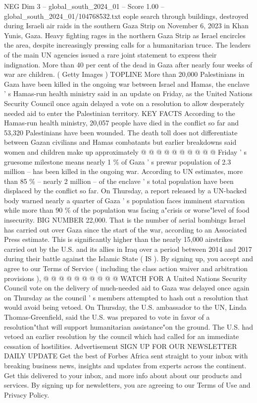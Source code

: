 \begin{textsample}{NEG Dim 3 – global\_south\_2024\_01 – Score 1.00 – global\_south\_2024\_01/104768532.txt}  \label{ex:f3_neg_104}
eople search through buildings, destroyed during Israeli air raids in the southern Gaza Strip on November 6, 2023 in Khan Yunis, Gaza.
Heavy fighting rages in the northern Gaza Strip as Israel encircles the area, despite increasingly pressing calls for a humanitarian truce.
The leaders of the main UN agencies issued a rare joint statement to express their indignation.
More than 40 per cent of the dead in Gaza after nearly four weeks of war are children. ( Getty Images ) TOPLINE More than 20,000 Palestinians in Gaza have been killed in the ongoing war between Israel and Hamas, the enclave ' s Hamas-run health ministry said in an update on Friday, as the United Nations Security Council once again delayed a vote on a resolution to allow desperately needed aid to enter the Palestinian territory.
KEY FACTS According to the Hamas-run health ministry, 20,057 people have died in the conflict so far and 53,320 Palestinians have been wounded.
The death toll does not differentiate between Gazan civilians and Hamas combatants but earlier breakdowns said women and children make up approximately @ @ @ @ @ @ @ @ @ @ Friday ' s gruesome milestone means nearly 1 \% of Gaza ' s prewar population of 2.3 million -- has been killed in the ongoing war.
According to UN estimates, more than 85 \% -- nearly 2 million -- of the enclave ' s total population have been displaced by the conflict so far.
On Thursday, a report released by a UN-backed body warned nearly a quarter of Gaza ' s population faces imminent starvation while more than 90 \% of the population was facing a"crisis or worse"level of food insecurity.
BIG NUMBER 22,000.
That is the number of aerial bombings Israel has carried out over Gaza since the start of the war, according to an Associated Press estimate.
This is significantly higher than the nearly 15,000 airstrikes carried out by the U.S. and its allies in Iraq over a period between 2014 and 2017 during their battle against the Islamic State ( IS ).
By signing up, you accept and agree to our Terms of Service ( including the class action waiver and arbitration provisions ), @ @ @ @ @ @ @ @ @ @ WATCH FOR A United Nations Security Council vote on the delivery of much-needed aid to Gaza was delayed once again on Thursday as the council ' s members attempted to hash out a resolution that would avoid being vetoed.
On Thursday, the U.S. ambassador to the UN, Linda Thomas-Greenfield, said the U.S. was prepared to vote in favor of a resolution"that will support humanitarian assistance"on the ground.
The U.S. had vetoed an earlier resolution by the council which had called for an immediate cessation of hostilities.
Advertisement SIGN UP FOR OUR NEWSLETTER DAILY UPDATE Get the best of Forbes Africa sent straight to your inbox with breaking business news, insights and updates from experts across the continent.
Get this delivered to your inbox, and more info about about our products and services.
By signing up for newsletters, you are agreeing to our Terms of Use and Privacy Policy.

\end{textsample}
